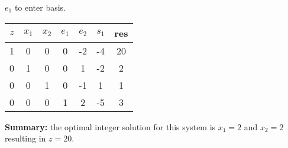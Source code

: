 \documentclass[answers]{exam}
\begin{document}
\begin{questions}
$e_1$ to enter basis.

\begin{tabular}{ccccccc}
	$z$ & $x_1$ & $x_2$ & $e_1$ & $e_2$ & $s_1$ & res \\ \hline
	1   & 0     & 0     & 0     & -2    & -4    & 20  \\
	0   & 1     & 0     & 0     & 1     & -2    & 2   \\
	0   & 0     & 1     & 0     & -1    & 1     & 1   \\
	0   & 0     & 0     & 1     & 2     & -5    & 3  
\end{tabular}

\textbf{Summary: } the optimal integer solution for this system is 
\(x_1=2\) and \(x_2=2\) resulting in \(z=20\).


\end{questions}
\end{document}
